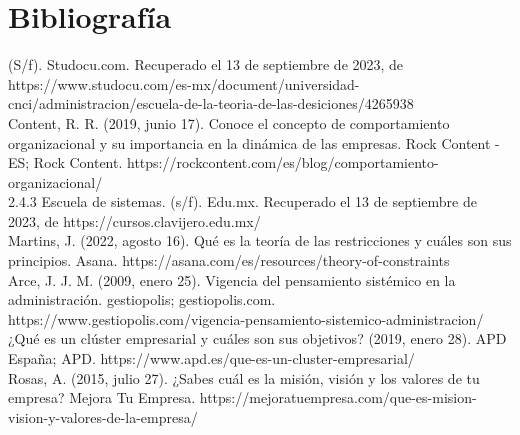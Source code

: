 \documentclass[letterpaper,12pt]{article}
\begin{document}
\begin{sloppypar}
\begin{enumerate}
\end{enumerate}
\newpage
\section*{Bibliografía}
(S/f). Studocu.com. Recuperado el 13 de septiembre de 2023, de https://www.studocu.com/es-mx/document/universidad-cnci/administracion/escuela-de-la-teoria-de-las-desiciones/4265938
\vspace{0.3cm}\\ 
Content, R. R. (2019, junio 17). Conoce el concepto de comportamiento organizacional y su importancia en la dinámica de las empresas. Rock Content - ES; Rock Content. https://rockcontent.com/es/blog/comportamiento-organizacional/
\vspace{0.3cm}\\ 
2.4.3 Escuela de sistemas. (s/f). Edu.mx. Recuperado el 13 de septiembre de 2023, de https://cursos.clavijero.edu.mx/
\vspace{0.3cm}\\ 
Martins, J. (2022, agosto 16). Qué es la teoría de las restricciones y cuáles son sus principios. Asana. https://asana.com/es/resources/theory-of-constraints
\vspace{0.3cm}\\ 
Arce, J. J. M. (2009, enero 25). Vigencia del pensamiento sistémico en la administración. gestiopolis; gestiopolis.com. https://www.gestiopolis.com/vigencia-pensamiento-sistemico-administracion/
\vspace{0.3cm}\\ 
¿Qué es un clúster empresarial y cuáles son sus objetivos? (2019, enero 28). APD España; APD. https://www.apd.es/que-es-un-cluster-empresarial/
\vspace{0.3cm}\\ 
Rosas, A. (2015, julio 27). ¿Sabes cuál es la misión, visión y los valores de tu empresa? Mejora Tu Empresa. https://mejoratuempresa.com/que-es-mision-vision-y-valores-de-la-empresa/



















\end{sloppypar}
\end{document}
